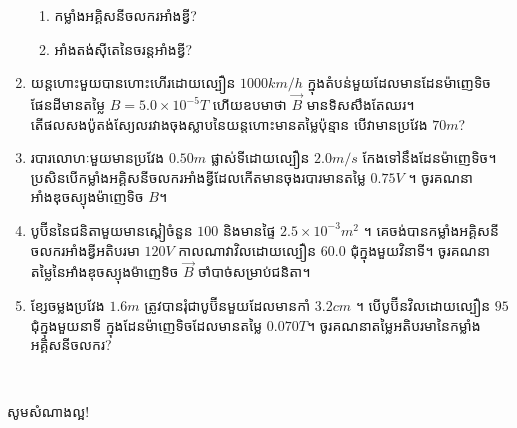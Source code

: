 \documentclass{officialexam}
\begin{document}
\begin{enumerate}[m]
		\begin{enumerate}[k]
			\item កម្លាំងអគ្គិសនីចលករអាំងឌ្វី?
			\item អាំងតង់សុីតេនៃចរន្តអាំងឌ្វី?
		\end{enumerate}
		\item យន្តហោះមួយបានហោះហើរដោយល្បឿន $1000km/h$ ក្នុងតំបន់មួយដែលមានដែនម៉ាញេទិចផែនដីមានតម្លៃ $B=5.0\times10^{-5}T$ ហើយឧបមាថា $\vec{B}$ មានទិសសឹងតែឈរ។\\ តើផលសងប៉ូតង់ស្យែលរវាងចុងស្លាបនៃយន្តហោះមានតម្លៃប៉ុន្មាន បើវាមានប្រវែង $70m$? 
		\item របារលោហៈមួយមានប្រវែង $0.50m$ ផ្លាស់ទីដោយល្បឿន $2.0m/s$ កែងទៅនឹងដែនម៉ាញេទិច។ ប្រសិនបើកម្លាំងអគ្គិសនីចលករអាំងឌ្វីដែលកើតមានចុងរបារមានតម្លៃ $0.75V$ ។ ចូរគណនាអាំងឌុចស្យុងម៉ាញេទិច $B$។
		\item បូប៊ីននៃជនិតាមួយមានស្ពៀចំនួន $100$ និងមានផ្ទៃ $2.5\times10^{-3}m^2$ ។ គេចង់បានកម្លាំងអគ្គិសនីចលករអាំងឌ្វីអតិបរមា $120V$ កាលណាវាវិលដោយល្បឿន $60.0$ ជុំក្នុងមួយវិនាទី។ ចូរគណនាតម្លៃនៃអាំងឌុចស្យុងម៉ាញេទិច $\vec{B}$ ចាំបាច់សម្រាប់ជនិតា។
		\item ខ្សែចម្លងប្រវែង $1.6m$ ត្រូវបានរុំជាបូប៊ីនមួយដែលមានកាំ $3.2cm$ ។ បើបូប៊ីនវិលដោយល្បឿន $95$ ជុំក្នុងមួយនាទី ក្នុងដែនម៉ាញេទិចដែលមានតម្លៃ $0.070T$។ ចូរគណនាតម្លៃអតិបរមានៃកម្លាំងអគ្គិសនីចលករ?
	\end{enumerate}
\\
\begin{center}
	\sffamily\color{blue}
	សូមសំណាងល្អ!
\end{center}\newpage
{}
\end{document}

